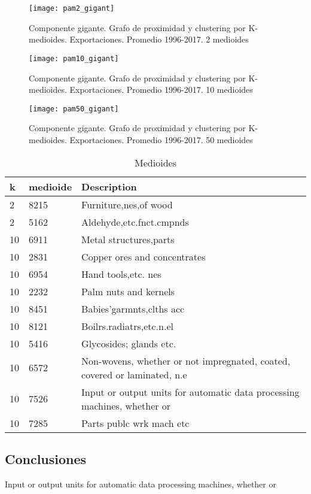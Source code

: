 \documentclass[class=article, crop=false]{standalone}
\begin{document}
\begin{figure}
	\centering	
	\texttt{[image: pam2\_gigant]}
	\caption{Componente gigante. Grafo de proximidad y clustering por K-medioides. Exportaciones. Promedio 1996-2017. 2 medioides}
	\label{fig:clustering2}
\end{figure}

\begin{figure}
	\centering	
	\texttt{[image: pam10\_gigant]}
	\caption{Componente gigante. Grafo de proximidad y clustering por K-medioides. Exportaciones. Promedio 1996-2017. 10 medioides}
	\label{fig:clustering10}
\end{figure}

\begin{figure}
	\centering	
	\texttt{[image: pam50\_gigant]}
	\caption{Componente gigante. Grafo de proximidad y clustering por K-medioides. Exportaciones. Promedio 1996-2017. 50 medioides}
	\label{fig:clustering50}
\end{figure}



\begin{table}[ht]
	\centering
	\begin{tabular}{lll}
		\hline
		k & medioide & Description \\ 
		\hline
		2 & 8215 & Furniture,nes,of wood \\ 
		2 & 5162 & Aldehyde,etc.fnct.cmpnds \\ 
		10 & 6911 & Metal structures,parts \\ 
		10 & 2831 & Copper ores and concentrates \\ 
		10 & 6954 & Hand tools,etc. nes \\ 
		10 & 2232 & Palm nuts and kernels \\ 
		10 & 8451 & Babies'garmnts,clths acc \\ 
		10 & 8121 & Boilrs.radiatrs,etc.n.el \\ 
		10 & 5416 & Glycosides; glands etc. \\ 
		10 & 6572 & Non-wovens, whether or not impregnated, coated, covered or laminated, n.e \\ 
		10 & 7526 & Input or output units for automatic data processing machines, whether or \\ 
		10 & 7285 & Parts publc wrk mach etc \\ 
		\hline
	\end{tabular}
	\caption{Medioides} 
	\label{table:pam}
\end{table}


\subsection{Conclusiones}

Input or output units for automatic data processing machines, whether or



%
%
%
\end{document}
